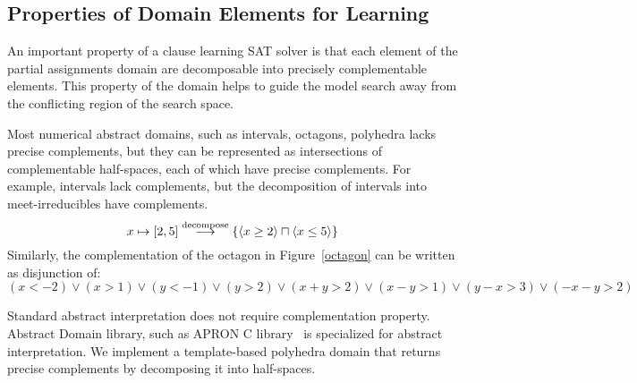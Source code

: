 \subsection{Properties of Domain Elements for Learning}
%
An important property of a clause learning SAT solver 
is that each element of the partial assignments domain 
are decomposable into precisely complementable 
elements.  This property of the domain helps to guide 
the model search away from the conflicting region of the 
search space.  

Most numerical abstract domains, such as intervals, octagons, 
polyhedra lacks precise complements, but they can be 
represented as intersections of complementable half-spaces, 
each of which have precise complements.  For example, intervals 
lack complements, but the decomposition of intervals into 
meet-irreducibles have complements.  
\[x \mapsto [2,5] \mathrel{\mathop{\longrightarrow}^{\mathrm{decompose}}} \{\langle x
\geq 2 \rangle \sqcap \langle x \leq 5 \rangle \} \]
Similarly, the complementation of the octagon in Figure~\ref{octagon} 
can be written as disjunction of:
\[(x<-2) \lor (x>1) \lor (y<-1) \lor (y>2) \lor (x+y>2) \lor (x-y>1) \lor (y-x>3) \lor (-x-y>2)\]

Standard abstract interpretation does not require complementation property.  
Abstract Domain library, such as APRON C library~\cite{apron} is specialized 
for abstract interpretation.  We implement a template-based polyhedra domain 
that returns precise complements by decomposing it into half-spaces.    


